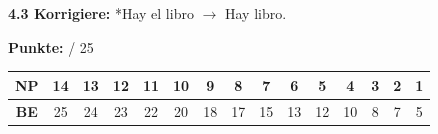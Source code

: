 \documentclass[11pt,a4paper]{article}
\newcommand{\luecke}[1]{\underline{\hspace{#1}}}
\begin{document}
\vspace{0.5cm}

\noindent\textbf{4.3 Korrigiere:} *Hay el libro $\rightarrow$ Hay \luecke{2cm} libro.

\vspace{1cm}

\begin{flushright}
\textbf{Punkte:} \luecke{1cm} / 25
\end{flushright}

\vspace{0.5cm}

\begin{tcolorbox}[colback=white, colframe=grau, title=\textbf{Bewertung (14-NP-Skala)}]
\begin{center}
\small
\begin{tabular}{|c|c|c|c|c|c|c|c|c|c|c|c|c|c|c|}
\hline
\textbf{NP} & 14 & 13 & 12 & 11 & 10 & 9 & 8 & 7 & 6 & 5 & 4 & 3 & 2 & 1 \\
\hline
\textbf{BE} & 25 & 24 & 23 & 22 & 20 & 18 & 17 & 15 & 13 & 12 & 10 & 8 & 7 & 5 \\
\hline
\end{tabular}
\end{center}
\end{tcolorbox}
\end{document}
